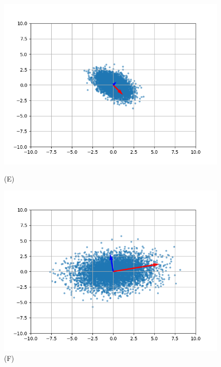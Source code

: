 \documentclass{article}
\begin{document}
\begin{figure}[!htb]
        \centering
        \begin{minipage}{0.24\textwidth}
                \centering
                \includegraphics[width=1\linewidth]{../Cov_4.png}
                \caption{(E)}
        \end{minipage}
        \begin{minipage}{0.24\textwidth}
                \centering
                \includegraphics[width=1\linewidth]{../Cov_5.png}
                \caption{(F)}
        \end{minipage}
        \begin{minipage}{0.24\textwidth}
        \centering

\end{minipage}
\end{figure}
\end{document}
